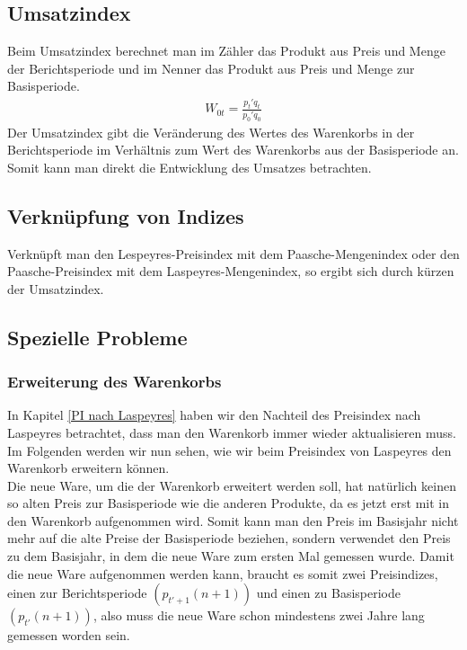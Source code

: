 \documentclass[a4paper]{article}
\begin{document}
\subsection{Umsatzindex}
Beim Umsatzindex berechnet man im Zähler das Produkt aus Preis und Menge der Berichtsperiode und im Nenner das Produkt aus Preis und Menge zur Basisperiode.
\begin{align*}
    W_{0t}=\frac{p_t'q_t}{p_0'q_0}
\end{align*}
Der Umsatzindex gibt die Veränderung des Wertes des Warenkorbs in der Berichtsperiode im Verhältnis zum Wert des Warenkorbs aus der Basisperiode an.
Somit kann man direkt die Entwicklung des Umsatzes betrachten.

\subsection{Verknüpfung von Indizes}
Verknüpft man den Lespeyres-Preisindex mit dem Paasche-Mengenindex oder den Paasche-Preisindex mit dem Laspeyres-Mengenindex, so ergibt sich durch kürzen der Umsatzindex.

\subsection{Spezielle Probleme}
\subsubsection{Erweiterung des Warenkorbs}
In Kapitel \ref{PI nach Laspeyres} haben wir den Nachteil des Preisindex nach Laspeyres betrachtet, dass man den Warenkorb immer wieder aktualisieren muss.  Im Folgenden werden wir nun sehen, wie wir beim Preisindex von Laspeyres den Warenkorb erweitern können. \\
Die neue Ware, um die der Warenkorb erweitert werden soll, hat natürlich keinen so alten Preis zur Basisperiode wie die anderen Produkte, da es jetzt erst mit in den Warenkorb aufgenommen wird. Somit kann man den Preis im Basisjahr nicht mehr auf die alte Preise der Basisperiode beziehen, sondern verwendet den Preis zu dem Basisjahr, in dem die neue Ware zum ersten Mal gemessen wurde. Damit die neue Ware aufgenommen werden kann, braucht es somit zwei Preisindizes, einen zur Berichtsperiode $(p_{t'+1}(n+1))$ und einen zu Basisperiode $(p_{t'}(n+1))$, also muss die neue Ware schon mindestens zwei Jahre lang gemessen worden sein.
\end{document}
